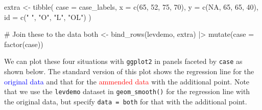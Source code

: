 \documentclass[
  letterpaper,
  10pt,
  krantz2]{krantz}
\makeatletter
\newenvironment{Shaded}{\begin{snugshade}}{\end{snugshade}}
\newcommand{\AttributeTok}[1]{\textcolor[rgb]{0.40,0.45,0.13}{#1}}
\newcommand{\CommentTok}[1]{\textcolor[rgb]{0.37,0.37,0.37}{#1}}
\newcommand{\ConstantTok}[1]{\textcolor[rgb]{0.56,0.35,0.01}{#1}}
\newcommand{\DecValTok}[1]{\textcolor[rgb]{0.68,0.00,0.00}{#1}}
\newcommand{\FunctionTok}[1]{\textcolor[rgb]{0.28,0.35,0.67}{#1}}
\newcommand{\NormalTok}[1]{\textcolor[rgb]{0.00,0.23,0.31}{#1}}
\newcommand{\OtherTok}[1]{\textcolor[rgb]{0.00,0.23,0.31}{#1}}
\newcommand{\SpecialCharTok}[1]{\textcolor[rgb]{0.37,0.37,0.37}{#1}}
\newcommand{\StringTok}[1]{\textcolor[rgb]{0.13,0.47,0.30}{#1}}
\newenvironment{kframe}{%
  \medskip{}
  \setlength{\fboxsep}{.8em}
  \def\at@end@of@kframe{}%
  \ifinner\ifhmode%
  \def\at@end@of@kframe{\end{minipage}}%
  \begin{minipage}{\columnwidth}%
  \fi\fi%
  \def\FrameCommand##1{\hskip\@totalleftmargin \hskip-\fboxsep
  \colorbox{shadecolor}{##1}\hskip-\fboxsep
      \hskip-\linewidth \hskip-\@totalleftmargin \hskip\columnwidth}%
  \MakeFramed {\advance\hsize-\width
    \@totalleftmargin\z@ \linewidth\hsize
    \@setminipage}}%
{\par\unskip\endMakeFramed%
  \at@end@of@kframe}
\renewenvironment{Shaded}{\begin{kframe}}{\end{kframe}}
\makeatother
\begin{document}
\begin{Shaded}
\begin{Highlighting}[]
\NormalTok{extra }\OtherTok{\textless{}{-}} \FunctionTok{tibble}\NormalTok{(}
  \AttributeTok{case =}\NormalTok{ case\_labels,}
  \AttributeTok{x  =} \FunctionTok{c}\NormalTok{(}\DecValTok{65}\NormalTok{, }\DecValTok{52}\NormalTok{, }\DecValTok{75}\NormalTok{, }\DecValTok{70}\NormalTok{),}
  \AttributeTok{y  =} \FunctionTok{c}\NormalTok{(}\ConstantTok{NA}\NormalTok{, }\DecValTok{65}\NormalTok{, }\DecValTok{65}\NormalTok{, }\DecValTok{40}\NormalTok{),}
  \AttributeTok{id =} \FunctionTok{c}\NormalTok{(}\StringTok{"  "}\NormalTok{, }\StringTok{"O"}\NormalTok{, }\StringTok{"L"}\NormalTok{, }\StringTok{"OL"}\NormalTok{)}
\NormalTok{)}

\CommentTok{\#\textquotesingle{} Join these to the data}
\NormalTok{both }\OtherTok{\textless{}{-}} \FunctionTok{bind\_rows}\NormalTok{(levdemo, extra) }\SpecialCharTok{|\textgreater{}}
  \FunctionTok{mutate}\NormalTok{(}\AttributeTok{case =} \FunctionTok{factor}\NormalTok{(case))}
\end{Highlighting}
\end{Shaded}

We can plot these four situations with \texttt{ggplot2} in panels
faceted by \texttt{case} as shown below. The standard version of this
plot shows the regression line for the \textcolor{blue}{original data}
and that for the \textcolor{red}{ammended data} with the additional
point. Note that we use the \texttt{levdemo} dataset in
\texttt{geom\_smooth()} for the regression line with the original data,
but specify \texttt{data\ =\ both} for that with the additional point.
\end{document}
